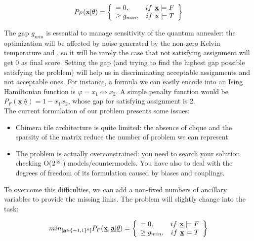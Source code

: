 \begin{equation}
    P_F(\underline{\textbf{x}} | \underline{\theta}) = 
    \left\{
        \begin{array}{lr}
            = 0, & if \textbf{ \underline{x}} \models F \\
            \geq g_{min}, & if \textbf{ \underline{x}} \models T
        \end{array}
    \right\}
\end{equation}

The gap $g_{min}$ is essential to manage sensitivity of the quantum annealer: the optimization will be affected by noise generated by the non-zero Kelvin temperature and , so it will be rarely the case that not satisfying assignment will get 0 as final score. Setting the gap (and trying to find the highest gap possible satisfying the problem) will help us in discriminating acceptable assignments and not acceptable ones.
For instance, a formula we can easily encode into an Ising Hamiltonian function is $\varphi = x_1 \iff x_2$. A simple penalty function would be $P_F(\underline{\textbf{x}} | \underline{\theta}) = 1 - x_1x_2$, whose gap for satisfying assignment is 2. \\
The current formulation of our problem presents some issues:

\begin{itemize}
    \item Chimera tile architecture is quite limited: the absence of clique and the sparsity of the matrix reduce the number of problem we can represent.
    \item The problem is actually overconstrained: you need to search your solution checking O($2^{|\textbf{\underline{x}}|}$) models/countermodels. You have also to deal with the degrees of freedom of its formulation caused by biases and couplings.
\end{itemize}

To overcome this difficulties, we can add a non-fixed numbers of ancillary variables to provide the missing links. The problem will slightly change into the task:

\begin{equation}
    min_{[\textbf{\underline{a}} \in \{-1,1\}^k]} P_F(\underline{\textbf{x}},\underline{\textbf{a}} | \underline{\theta}) = 
    \left\{
        \begin{array}{lr}
            = 0, & if \textbf{ \underline{x}} \models F \\
            \geq g_{min}, & if \textbf{ \underline{x}} \models T
        \end{array}
    \right\}
\end{equation}

